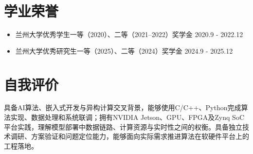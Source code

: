 \documentclass{logo-cv}
\begin{document}
\section{学业荣誉}
\begin{itemize}
    \item 兰州大学优秀学生一等（2020）、二等（2021--2022）奖学金 \hfill 2020.9 - 2022.12
    \item 兰州大学优秀研究生一等（2025）、二等（2024）奖学金 \hfill 2024.9 - 2025.12
\end{itemize}

\section{自我评价}
具备AI算法、嵌入式开发与异构计算交叉背景，能够使用C/C++、Python完成算法实现、数据处理和系统联调；拥有NVIDIA Jetson、GPU、FPGA及Zynq SoC平台实践，理解模型部署中数据链路、计算资源与实时性之间的权衡。具备独立技术调研、方案验证和问题定位能力，能够面向实际需求推进算法在软硬件平台上的工程落地。
\end{document}
